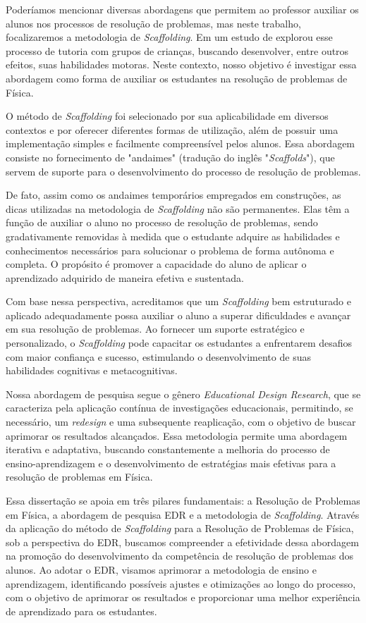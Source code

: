 Poderíamos mencionar diversas abordagens que permitem ao professor auxiliar os alunos nos processos de resolução de problemas, mas neste trabalho, focalizaremos a metodologia de \textit{Scaffolding}. Em um estudo de  explorou esse processo de tutoria com grupos de crianças, buscando desenvolver, entre outros efeitos, suas habilidades motoras. Neste contexto, nosso objetivo é investigar essa abordagem como forma de auxiliar os estudantes na resolução de problemas de Física.

O método de \textit{Scaffolding} foi selecionado por sua aplicabilidade em diversos contextos e por oferecer diferentes formas de utilização, além de possuir uma implementação simples e facilmente compreensível pelos alunos. Essa abordagem consiste no fornecimento de "andaimes" (tradução do inglês "\textit{Scaffolds}"), que servem de suporte para o desenvolvimento do processo de resolução de problemas.

De fato, assim como os andaimes temporários empregados em construções, as dicas utilizadas na metodologia de \textit{Scaffolding} não são permanentes. Elas têm a função de auxiliar o aluno no processo de resolução de problemas, sendo gradativamente removidas à medida que o estudante adquire as habilidades e conhecimentos necessários para solucionar o problema de forma autônoma e completa. O propósito é promover a capacidade do aluno de aplicar o aprendizado adquirido de maneira efetiva e sustentada.

Com base nessa perspectiva, acreditamos que um \textit{Scaffolding} bem estruturado e aplicado adequadamente possa auxiliar o aluno a superar dificuldades e avançar em sua resolução de problemas. Ao fornecer um suporte estratégico e personalizado, o \textit{Scaffolding} pode capacitar os estudantes a enfrentarem desafios com maior confiança e sucesso, estimulando o desenvolvimento de suas habilidades cognitivas e metacognitivas.

Nossa abordagem de pesquisa segue o gênero \textit{Educational Design Research}, que se caracteriza pela aplicação contínua de investigações educacionais, permitindo, se necessário, um \textit{redesign} e uma subsequente reaplicação, com o objetivo de buscar aprimorar os resultados alcançados. Essa metodologia permite uma abordagem iterativa e adaptativa, buscando constantemente a melhoria do processo de ensino-aprendizagem e o desenvolvimento de estratégias mais efetivas para a resolução de problemas em Física.

Essa dissertação se apoia em três pilares fundamentais: a Resolução de Problemas em Física, a abordagem de pesquisa EDR e a metodologia de \textit{Scaffolding}. Através da aplicação do método de \textit{Scaffolding} para a Resolução de Problemas de Física, sob a perspectiva do EDR, buscamos compreender a efetividade dessa abordagem na promoção do desenvolvimento da competência de resolução de problemas dos alunos. Ao adotar o EDR, visamos aprimorar a metodologia de ensino e aprendizagem, identificando possíveis ajustes e otimizações ao longo do processo, com o objetivo de aprimorar os resultados e proporcionar uma melhor experiência de aprendizado para os estudantes.

